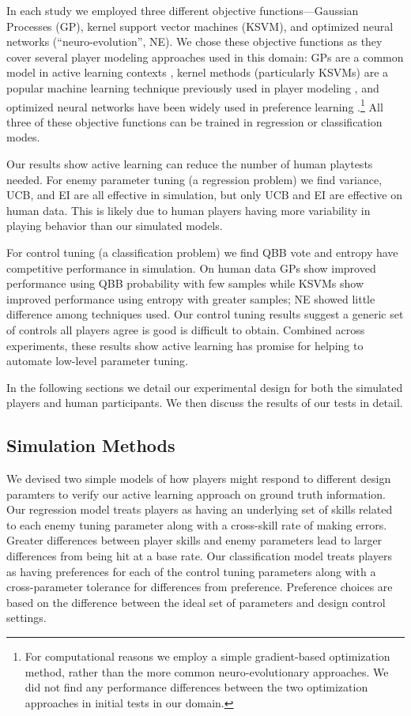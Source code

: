 \documentclass{sig-alternate}
\begin{document}
In each study we employed three different objective functions---Gaussian Processes (GP), kernel support vector machines (KSVM), and optimized neural networks (``neuro-evolution'', NE).
We chose these objective functions as they cover several player modeling approaches used in this domain: GPs are a common model in active learning contexts \cite{brochu2010:thesis}, kernel methods (particularly KSVMs) are a popular machine learning technique previously used in player modeling \cite{yu2011:minboredom}, and optimized neural networks have been widely used in preference learning \cite{yannakakis2011:edpcg}.\footnote{For computational reasons we employ a simple gradient-based optimization method, rather than the more common neuro-evolutionary approaches. We did not find any performance differences between the two optimization approaches in initial tests in our domain.}
All three of these objective functions can be trained in regression or classification modes.

Our results show active learning can reduce the number of human playtests needed.
For enemy parameter tuning (a regression problem) we find variance, UCB, and EI are all effective in simulation, but only UCB and EI are effective on human data.
This is likely due to human players having more variability in playing behavior than our simulated models.

For control tuning (a classification problem) we find QBB vote and entropy have competitive performance in simulation.
On human data GPs show improved performance using QBB probability with few samples while KSVMs show improved performance using entropy with greater samples; NE showed little difference among techniques used.
Our control tuning results suggest a generic set of controls all players agree is good is difficult to obtain.
Combined across experiments, these results show active learning has promise for helping to automate low-level parameter tuning.

In the following sections we detail our experimental design for both the simulated players and human participants.
We then discuss the results of our tests in detail.


\subsection{Simulation Methods}
We devised two simple models of how players might respond to different design paramters to verify our active learning approach on ground truth information.
Our regression model treats players as having an underlying set of skills related to each enemy tuning parameter along with a cross-skill rate of making errors.
Greater differences between player skills and enemy parameters lead to larger differences from being hit at a base rate.
Our classification model treats players as having preferences for each of the control tuning parameters along with a cross-parameter tolerance for differences from preference.
Preference choices are based on the difference between the ideal set of parameters and design control settings.
\end{document}
